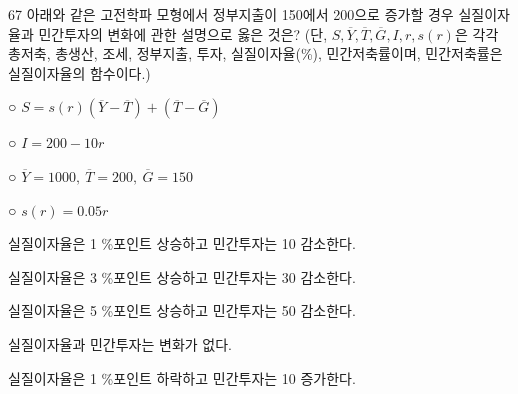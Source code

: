 \begin{question}{67}
아래와 같은 고전학파 모형에서 정부지출이 150에서 200으로 증가할 경우 실질이자율과 민간투자의 변화에 관한 설명으로 옳은 것은? (단, $S,\overline{Y},\overline{T},\overline{G},I,r,s(r)$은 각각 총저축, 총생산, 조세, 정부지출, 투자, 실질이자율(\%), 민간저축률이며, 민간저축률은 실질이자율의 함수이다.)
\begin{framedtext}
○ $S=s(r)(\overline{Y}-\overline{T})+(\overline{T}-\overline{G})$ \par
○ $I=200-10r$ \par
○ $\overline{Y}=1000,\ \overline{T}=200,\ \overline{G}=150$ \par
○ $s(r)=0.05r$ \par
\end{framedtext}
\begin{choices}
  \item 실질이자율은 1 \%포인트 상승하고 민간투자는 10 감소한다.
  \item 실질이자율은 3 \%포인트 상승하고 민간투자는 30 감소한다.
  \item 실질이자율은 5 \%포인트 상승하고 민간투자는 50 감소한다.
  \item 실질이자율과 민간투자는 변화가 없다.
  \item 실질이자율은 1 \%포인트 하락하고 민간투자는 10 증가한다.
\end{choices}
\end{question}
